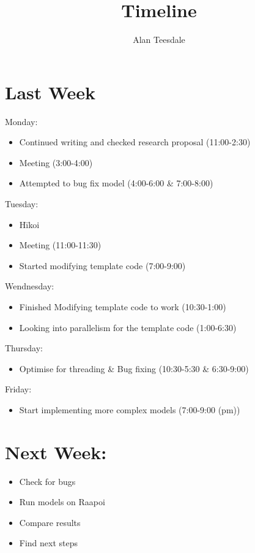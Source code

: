 \documentclass[]{article}
\title{Timeline}
\author{Alan Teesdale}
\begin{document}
	\maketitle
	\section{Last Week}
	Monday:
	\begin{itemize}
		\item Continued writing and checked research proposal (11:00-2:30)
		\item Meeting (3:00-4:00)
		\item Attempted to bug fix model (4:00-6:00 \& 7:00-8:00)
	\end{itemize}
	Tuesday:
	\begin{itemize}
		\item Hīkoi
		\item Meeting (11:00-11:30)
		\item Started modifying template code (7:00-9:00)
	\end{itemize}
	Wendnesday:
	\begin{itemize}
		\item Finished Modifying template code to work (10:30-1:00)
		\item Looking into parallelism for the template code (1:00-6:30)
	\end{itemize}
	Thursday:
	\begin{itemize}
		\item Optimise for threading \& Bug fixing (10:30-5:30 \& 6:30-9:00)  
	\end{itemize}
	Friday:
	\begin{itemize}
		\item Start implementing more complex models (7:00-9:00 (pm))
	\end{itemize}
	\section{Next Week:}
	\begin{itemize}
		\item Check for bugs
		\item Run models on Raapoi
		\item Compare results
		\item Find next steps
	\end{itemize}
\end{document}
